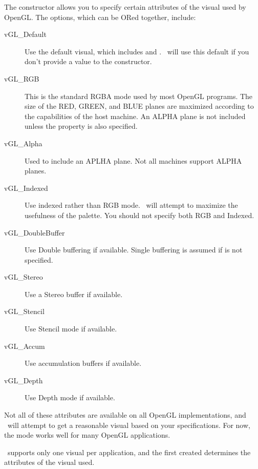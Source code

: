 The  constructor allows you to specify
certain attributes of the visual used by OpenGL. The options,
which can be ORed together, include:

\begin{description}

\item[vGL\_Default] Use the default visual, which includes
 and . \V\ will
use this default if you don't provide a value to the constructor.

\item[vGL\_RGB] This is the standard RGBA mode used by
most OpenGL programs. The size of the RED, GREEN, and
BLUE planes are maximized according to the capabilities
of the host machine. An ALPHA plane is not included
unless the  property is also specified.

\item[vGL\_Alpha] Used to include an APLHA plane. Not all
machines support ALPHA planes.

\item[vGL\_Indexed] Use indexed rather than RGB mode. \V\
will attempt to maximize the usefulness of the palette.
You should not specify both RGB and Indexed.

\item[vGL\_DoubleBuffer] Use Double buffering if available.
Single buffering is assumed if  is not
specified.

\item[vGL\_Stereo] Use a Stereo buffer if available.

\item[vGL\_Stencil] Use Stencil mode if available.

\item[vGL\_Accum] Use accumulation buffers if available.

\item[vGL\_Depth] Use Depth mode if available.

\end{description}

Not all of these attributes are available on all OpenGL implementations,
and \V\ will attempt to get a reasonable visual based on your
specifications. For now, the  mode works well
for many OpenGL applications.

\V\ supports only one visual per application, and the first
 created determines the attributes of
the visual used.

